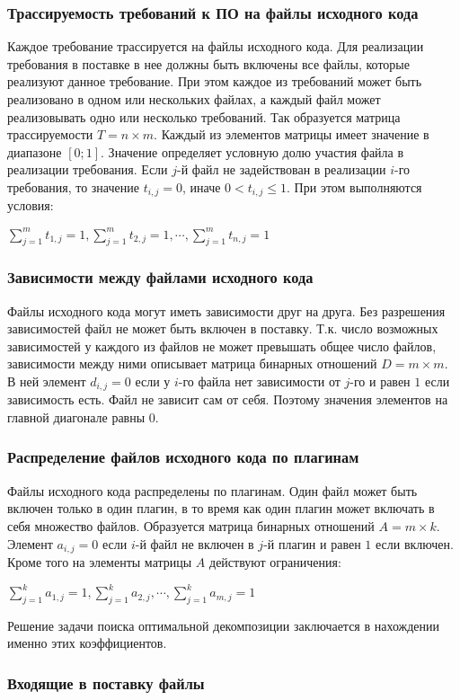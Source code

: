 \subsubsection*{Трассируемость требований к ПО на файлы исходного кода}
Каждое требование трассируется на файлы исходного кода. Для реализации требования в поставке в нее должны быть включены все файлы, которые реализуют данное требование. При этом каждое из требований может быть реализовано в одном или нескольких файлах, а каждый файл может реализовывать одно или несколько требований. Так образуется матрица трассируемости $T = n \times m$. Каждый из элементов матрицы имеет значение в диапазоне $[0;1]$. Значение определяет условную долю участия файла в реализации требования. Если $j$-й файл не задействован в реализации $i$-го требования, то значение $t_{i, j} = 0$, иначе $0 < t_{i, j} \le 1$. При этом выполняются условия:
\begin{center}
	$
		\displaystyle \sum^{m}_{j = 1}t_{1, j} = 1, 
		\sum^{m}_{j = 1}t_{2, j} = 1, \cdots, \sum^{m}_{j = 1}t_{n, j} = 1
	$
\end{center}

\subsubsection*{Зависимости между файлами исходного кода}
Файлы исходного кода могут иметь зависимости друг на друга. Без разрешения зависимостей файл не может быть включен в поставку. Т.к. число возможных зависимостей у каждого из файлов не может превышать общее число файлов, зависимости между ними описывает матрица бинарных отношений $D = m \times m$. В ней элемент $d_{i, j} = 0$ если у $i$-го файла нет зависимости от $j$-го и равен $1$ если зависимость есть. Файл не зависит сам от себя. Поэтому значения элементов на главной диагонале равны $0$.

\subsubsection*{Распределение файлов исходного кода по плагинам}
Файлы исходного кода распределены по плагинам. Один файл может быть включен только в один плагин, в то время как один плагин может включать в себя множество файлов. Образуется матрица бинарных отношений $A = m \times k$. Элемент $a_{i, j} = 0$ если $i$-й файл не включен в $j$-й плагин и равен $1$ если включен. Кроме того на элементы матрицы $A$ действуют ограничения:
\begin{center}
	$
		\displaystyle \sum^{k}_{j = 1}a_{1, j} = 1, \sum^{k}_{j = 1}a_{2, j}, \cdots, \sum^{k}_{j = 1}a_{m, j} = 1
	$
\end{center}
Решение задачи поиска оптимальной декомпозиции заключается в нахождении именно этих коэффициентов.

\subsubsection*{Входящие в поставку файлы}


